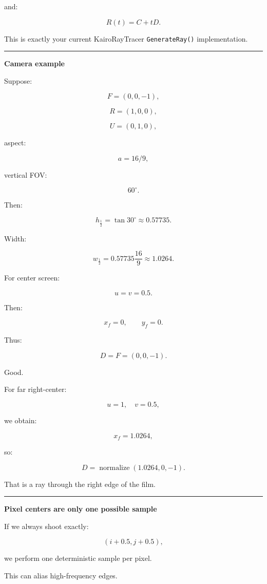 and:

\[
\boxed{
R(t)=C+tD.
}
\]

This is exactly your current KairoRayTracer \texttt{GenerateRay()} implementation.

\begin{center}\rule{0.5\linewidth}{0.5pt}\end{center}

\textbf{Camera example}

Suppose:

\[
F=(0,0,-1),
\]

\[
R=(1,0,0),
\]

\[
U=(0,1,0),
\]

aspect:

\[
a=16/9,
\]

vertical FOV:

\[
60^\circ.
\]

Then:

\[
h_{\frac12}
=
\tan30^\circ
\approx0.57735.
\]

Width:

\[
w_{\frac12}
=
0.57735\frac{16}{9}
\approx1.0264.
\]

For center screen:

\[
u=v=0.5.
\]

Then:

\[
x_f=0,
\qquad
y_f=0.
\]

Thus:

\[
D=F=(0,0,-1).
\]

Good.

For far right-center:

\[
u=1,
\quad
v=0.5,
\]

we obtain:

\[
x_f=1.0264,
\]

so:

\[
D
=
\operatorname{normalize}
(1.0264,0,-1).
\]

That is a ray through the right edge of the film.

\begin{center}\rule{0.5\linewidth}{0.5pt}\end{center}

\textbf{Pixel centers are only one possible sample}

If we always shoot exactly:

\[
(i+0.5,j+0.5),
\]

we perform one deterministic sample per pixel.

This can alias high-frequency edges.


